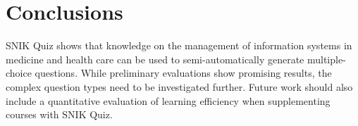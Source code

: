 \documentclass{IOS-Book-Article}     %
\newcommand{\citet}{\cite}%
\begin{document}

\section{Conclusions}
SNIK Quiz shows that knowledge on the management of information systems in medicine and health care can be used to semi-automatically generate multiple-choice questions.
While preliminary evaluations show promising results, the complex question types need to be investigated further.
Future work should also include a quantitative evaluation of learning efficiency when supplementing courses with SNIK Quiz.

%


\end{document}
